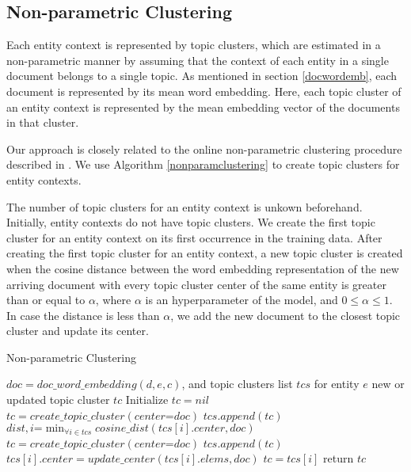 \documentclass{article}
\begin{document}
\subsection{Non-parametric Clustering}

Each entity context is represented by topic clusters, which are estimated in a non-parametric manner by assuming that the context of each entity in a single document belongs to a single topic. As mentioned in section \ref{docwordemb}, each document is represented by its mean word embedding. Here, each topic cluster of an entity context is represented by the mean embedding vector of the documents in that cluster.

Our approach is closely related to the online non-parametric clustering procedure described in \cite{Arvind14}.
We use Algorithm \ref{nonparamclustering} to create topic clusters for entity contexts.

The number of topic clusters for an entity context is unkown beforehand. Initially, entity contexts do not have topic clusters. We create the first topic cluster for an entity context on its first occurrence in the training data. After creating the first topic cluster for an entity context, a new topic cluster is created when the cosine distance between the word embedding representation of the new arriving document with every topic cluster center of the same entity is greater than or equal to $\alpha$, where $\alpha$ is an hyperparameter of the model, and $0 \leq \alpha \leq 1$. In case the distance is less than $\alpha$, we add the new document to the closest topic cluster and update its center.

\begin{algorithm}[tb]
   \caption{Non-parametric Clustering}
   \label{nonparamclustering}
\begin{algorithmic}
    $doc=doc\_word\_embedding(d, e, c)$, and topic clusters list $tcs$ for entity $e$
    new or updated topic cluster $tc$
   \STATE Initialize $tc = nil$
    \STATE $tc = create\_topic\_cluster(center\mathord{=}doc)$
    \STATE $tcs.append(tc)$
   \ELSE
     \STATE $dist, i \mathord{=} \min_{\forall{i \in tcs}}{cosine\_dist(tcs[i].center, doc)}$
        \STATE $tc = create\_topic\_cluster(center\mathord{=}doc)$
        \STATE $tcs.append(tc)$
     \ELSE
        \STATE $tcs[i].center = update\_center(tcs[i].elems, doc)$
        \STATE $tc = tcs[i]$
     \ENDIF
   \ENDIF
   \STATE return $tc$
\end{algorithmic}
\end{algorithm}
\end{document}
